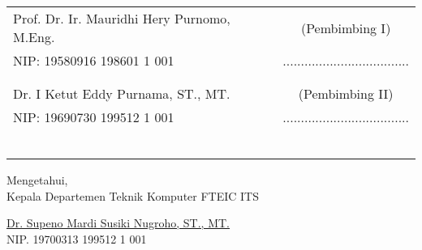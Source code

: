     \noindent
    \begin{tabularx}{\textwidth}{X c}
      Prof. Dr. Ir. Mauridhi Hery Purnomo, M.Eng.          & (Pembimbing I) \\
      NIP: 	19580916 198601 1 001       & ................................... \\
      &  \\
      &  \\
      Dr. I Ketut Eddy Purnama, ST., MT.     & (Pembimbing II) \\
      NIP: 19690730 199512 1 001        & ................................... \\
      &  \\
      &  \\
      &  \\
      &  \\
      &  \\
      &  \\
    \end{tabularx}
  \endgroup

  \vspace{2ex}

  \begin{center}
    Mengetahui, \\
    Kepala Departemen Teknik Komputer FTEIC ITS\\

    \vspace{8ex}

    \underline{Dr. Supeno Mardi Susiki Nugroho, ST., MT.} \\
    NIP. 19700313 199512 1 001
  \end{center}
\endgroup
